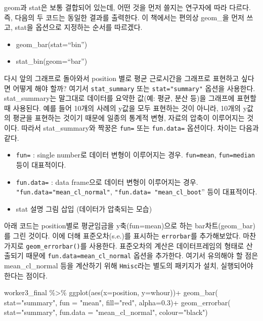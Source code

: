 \documentclass[
]{book}
\newenvironment{Shaded}{\begin{snugshade}}{\end{snugshade}}
\newcommand{\AttributeTok}[1]{\textcolor[rgb]{0.77,0.63,0.00}{#1}}
\newcommand{\FloatTok}[1]{\textcolor[rgb]{0.00,0.00,0.81}{#1}}
\newcommand{\FunctionTok}[1]{\textcolor[rgb]{0.00,0.00,0.00}{#1}}
\newcommand{\NormalTok}[1]{#1}
\newcommand{\SpecialCharTok}[1]{\textcolor[rgb]{0.00,0.00,0.00}{#1}}
\newcommand{\StringTok}[1]{\textcolor[rgb]{0.31,0.60,0.02}{#1}}
\providecommand{\tightlist}{%
  \setlength{\itemsep}{0pt}\setlength{\parskip}{0pt}}
\theoremstyle{definition}
\theoremstyle{definition}
\theoremstyle{definition}
\theoremstyle{definition}
\theoremstyle{remark}
\begin{document}
geom과 stat은 보통 결합되어 있는데, 어떤 것을 먼저 쓸지는 연구자에 따라 다르다. 즉, 다음의 두 코드는 동일한 결과를 출력한다. 이 책에서는 편의상 geom\_을 먼저 쓰고, stat을 옵션으로 지정하는 순서를 따르겠다.

\begin{itemize}
\tightlist
\item
  geom\_bar(stat=``bin'')
\item
  stat\_bin(geom=``bar'')
\end{itemize}

다시 앞의 그래프로 돌아와서 position 별로 평균 근로시간을 그래프로 표현하고 싶다면 어떻게 해야 할까? 여기서 \texttt{stat\_summary} 또는 \texttt{stat="summary"} 옵션을 사용한다. stat\_summary는 말그대로 데이터를 요약한 값(예: 평균, 분산 등)을 그래프에 표현할때 사용된다. 예를 들어 10개의 사례의 y값을 모두 표현하는 것이 아니라, 10개의 y값의 평균을 표현하는 것이기 때문에 일종의 통계적 변형, 자료의 압축이 이루어지는 것이다. 따라서 stat\_summary와 짝꿍은 \texttt{fun=} 또는 \texttt{fun.data=} 옵션이다. 차이는 다음과 같다.

\begin{itemize}
\item
  \texttt{fun=} : single number로 데이터 변형이 이루어지는 경우. \texttt{fun=mean}, \texttt{fun=median} 등이 대표적이다.
\item
  \texttt{fun.data=} : data frame으로 데이터 변형이 이루어지는 경우. \texttt{"fun.data="mean\_cl\_normal"}, \texttt{"fun.data=\ "mean\_cl\_boot}'' 등이 대표적이다.
\item
  stat 설명 그림 삽입 (데이터가 압축되는 모습)
\end{itemize}

아래 코드는 position별로 평균임금을 y축(fun=mean)으로 하는 bar차트(geom\_bar)를 그린 것이다. 이에 더해 표준오차(s.e.)를 표시하는 \texttt{errorbar}를 추가해보았다. 마찬가지로 \texttt{geom\_errorbar()}를 사용한다. 표준오차의 계산은 데이터프레임의 형태로 산출되기 때문에 \texttt{fun.data=mean\_cl\_normal} 옵션을 추가한다. 여기서 유의해야 할 점은 mean\_cl\_normal 등을 계산하기 위해 \texttt{Hmisc}라는 별도의 패키지가 설치, 실행되어야 한다는 점이다.

\begin{Shaded}
\begin{Highlighting}[]
\NormalTok{worker3\_final }\SpecialCharTok{\%\textgreater{}\%} 
  \FunctionTok{ggplot}\NormalTok{(}\FunctionTok{aes}\NormalTok{(}\AttributeTok{x=}\NormalTok{position, }\AttributeTok{y=}\NormalTok{whour))}\SpecialCharTok{+}
  \FunctionTok{geom\_bar}\NormalTok{(}
    \AttributeTok{stat=}\StringTok{"summary"}\NormalTok{, }
    \AttributeTok{fun =} \StringTok{"mean"}\NormalTok{, }
    \AttributeTok{fill=}\StringTok{"red"}\NormalTok{, }
    \AttributeTok{alpha=}\FloatTok{0.3}\NormalTok{)}\SpecialCharTok{+}
  \FunctionTok{geom\_errorbar}\NormalTok{( }
    \AttributeTok{stat=}\StringTok{"summary"}\NormalTok{, }
    \AttributeTok{fun.data =} \StringTok{"mean\_cl\_normal"}\NormalTok{, }
    \AttributeTok{colour=}\StringTok{"black"}\NormalTok{)}
\end{Highlighting}
\end{Shaded}
\end{document}

